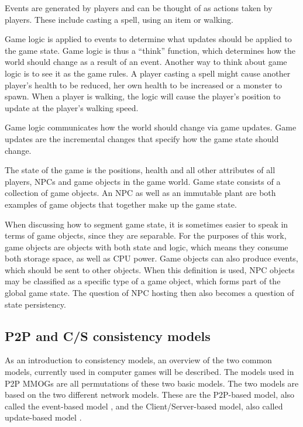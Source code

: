 \documentclass[journal,oneside,a4paper,onecolumn]{IEEEtran}
\begin{document}
\begin{description}
    \item[Events] Events are generated by players and can be thought of as actions taken by players. These include casting a spell, using an item or walking.
    \item[Game Logic] Game logic is applied to events to determine what updates should be applied to the game state. Game logic is thus a ``think'' function, which determines how the world should change as a result of an event. Another way to think about game logic is to see it as the game rules. A player casting a spell might cause another player's health to be reduced, her own health to be increased or a monster to spawn. When a player is walking, the logic will cause the player's position to update at the player's walking speed.
    \item[Update] Game logic communicates how the world should change via game updates. Game updates are the incremental changes that specify how the game state should change.
    \item[Game State] The state of the game is the positions, health and all other attributes of all players, NPCs and game objects in the game world. Game state consists of a collection of game objects. An NPC as well as an immutable plant are both examples of game objects that together make up the game state.
    \item[Game objects] When discussing how to segment game state, it is sometimes easier to speak in terms of game objects, since they are separable. For the purposes of this work, game objects are objects with both state and logic, which means they consume both storage space, as well as CPU power. Game objects can also produce events, which should be sent to other objects. When this definition is used, NPC objects may be classified as a specific type of a game object, which forms part of the global game state. The question of NPC hosting then also becomes a question of state persistency.
\end{description}



\subsection{P2P and C/S consistency models}
\label{classic_models}

As an introduction to consistency models, an overview of the two common models, currently used in computer games will be described. The models used in P2P MMOGs are all permutations of these two basic models. The two models are based on the two different network models. These are the P2P-based model, also called the event-based model \cite{p2p_cm_aoe}, and the Client/Server-based model, also called update-based model \cite{unreal_networking}.
\end{document}
